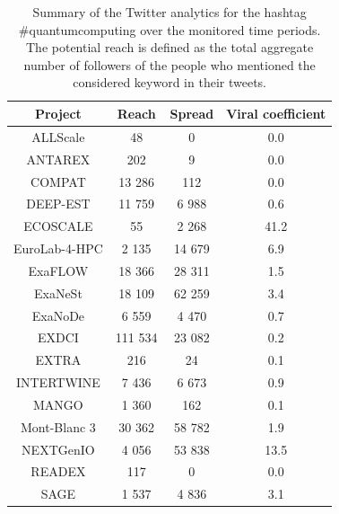 \begin{table}[t]
 \begin{center}
 {\scriptsize
  \begin{tabular}{cccc}
   \hline 
   \hline
   Project & Reach & Spread & Viral coefficient \\ 
   \hline
   \hline
   ALLScale & 48 & 0 & 0.0 \\
   ANTAREX & 202 & 9 & 0.0 \\
   COMPAT & 13 286 & 112 & 0.0 \\
   DEEP-EST & 11 759 & 6 988 & 0.6 \\
   ECOSCALE & 55 & 2 268 & 41.2 \\
   EuroLab-4-HPC & 2 135 & 14 679 & 6.9 \\
   ExaFLOW & 18 366 & 28 311 & 1.5 \\
   ExaNeSt & 18 109 & 62 259 & 3.4  \\
   ExaNoDe & 6 559 & 4 470 & 0.7 \\
   EXDCI & 111 534 & 23 082 & 0.2 \\
   EXTRA & 216 & 24 & 0.1 \\
   INTERTWINE & 7 436 & 6 673 & 0.9 \\
   MANGO & 1 360 & 162 & 0.1 \\
   Mont-Blanc 3 & 30 362 & 58 782 & 1.9 \\
   NEXTGenIO & 4 056 & 53 838 & 13.5 \\
   READEX & 117 & 0 & 0.0 \\
   SAGE & 1 537 & 4 836 & 3.1 \\ 
   \hline
   \hline
  \end{tabular}
 } 
 \end{center} 
 \caption{Summary of the Twitter analytics for the hashtag \#quantumcomputing over the monitored time periods. The potential reach is defined as the total aggregate number of followers of the people who mentioned the considered keyword in their tweets.}
\label{HPC_viral_coefficients} 
\end{table}